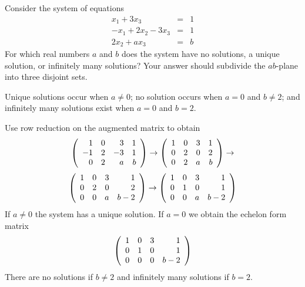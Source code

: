 \documentclass{ximera}
\author{YOUR NAME}
\begin{document}

\begin{exercise}\label{c2.4.2b.2}

Consider the system of equations
\[
\begin{array}{rcl}
x_1 + 3x_3 & = & 1 \\
-x_1+2x_2-3x_3 & = & 1\\
2x_2 + ax_3 & = & b
\end{array}
\]
For which real numbers $a$ and $b$ does the system have no solutions, a unique solution, or infinitely many solutions?  Your answer should subdivide the $ab$-plane into three disjoint sets.
  
\begin{solution}

\ans Unique solutions occur when $a\neq 0$; no solution occurs when $a=0$ and $b\neq 2$; and infinitely many solutions exist when $a = 0$ and $b =2$.

\soln 
Use row reduction on the augmented matrix to obtain
\[
\left(\begin{array}{rrrrrrrrrrrrrrrrrr} 1 & 0 & 3 & 1\\ -1 & 2 & -3 & 1 \\ 0 & 2 & a & b \end{array}\right) \to
\left(\begin{array}{rrrrrrrrrrrrrrrrrr} 1 & 0 & 3 & 1\\  0 & 2 & 0 & 2 \\ 0 & 2 & a & b \end{array}\right) \to
\]
\[
\left(\begin{array}{rrrrrrrrrrrrrrrrrr} 1 & 0 & 3 & 1\\  0 & 2 & 0 & 2 \\ 0 & 0 & a & b - 2 \end{array}\right) \to
\left(\begin{array}{rrrrrrrrrrrrrrrrrr} 1 & 0 & 3 & 1\\  0 & 1 & 0 & 1 \\ 0 & 0 & a & b - 2 \end{array}\right) 
\]
If $a\neq 0$ the system has a unique solution. If $a = 0$ we obtain the echelon form matrix
\[
\left(\begin{array}{rrrrrrrrrrrrrrrrrr} 1 & 0 & 3 & 1\\  0 & 1 & 0 & 1 \\ 0 & 0 & 0 & b - 2 \end{array}\right)
\]  
There are no solutions if $b\neq 2$ and infinitely many solutions if $b = 2$.

\end{solution}
\end{exercise}
\end{document}
